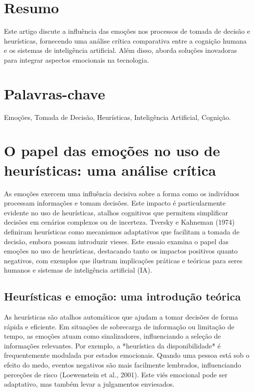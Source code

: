 \documentclass[a4paper,12pt]{report}
\begin{document}
	\section*{Resumo}
	Este artigo discute a influência das emoções nos processos de tomada de decisão e heurísticas, fornecendo uma análise crítica comparativa entre a cognição humana e os sistemas de inteligência artificial. Além disso, aborda soluções inovadoras para integrar aspectos emocionais na tecnologia.
	
	\section*{Palavras-chave}
	Emoções, Tomada de Decisão, Heurísticas, Inteligência Artificial, Cognição.
	
	\newpage
	
	
	
	\section{O papel das emoções no uso de heurísticas: uma análise crítica}
	
	As emoções exercem uma influência decisiva sobre a forma como os indivíduos processam informações e tomam decisões. Este impacto é particularmente evidente no uso de heurísticas, atalhos cognitivos que permitem simplificar decisões em cenários complexos ou de incerteza. Tversky e Kahneman (1974) definiram heurísticas como mecanismos adaptativos que facilitam a tomada de decisão, embora possam introduzir vieses. Este ensaio examina o papel das emoções no uso de heurísticas, destacando tanto os impactos positivos quanto negativos, com exemplos que ilustram implicações práticas e teóricas para seres humanos e sistemas de inteligência artificial (IA).
	
	\subsection{Heurísticas e emoção: uma introdução teórica}
	
	As heurísticas são atalhos automáticos que ajudam a tomar decisões de forma rápida e eficiente. Em situações de sobrecarga de informação ou limitação de tempo, as emoções atuam como sinalizadores, influenciando a seleção de informações relevantes. Por exemplo, a *heurística da disponibilidade* é frequentemente modulada por estados emocionais. Quando uma pessoa está sob o efeito do medo, eventos negativos são mais facilmente lembrados, influenciando perceções de risco (Loewenstein et al., 2001). Este viés emocional pode ser adaptativo, mas também levar a julgamentos enviesados.
	
\end{document}

